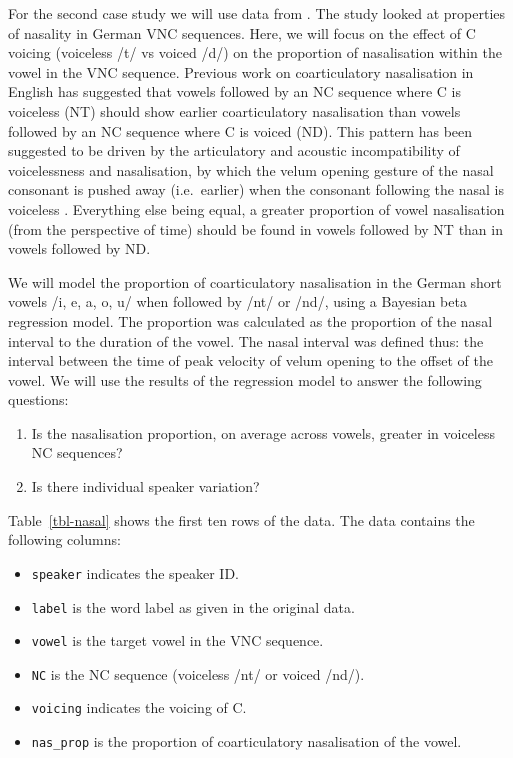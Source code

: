 \documentclass[
  authoryear,
  preprint,
  3p]{elsarticle}
\providecommand{\tightlist}{%
  \setlength{\itemsep}{0pt}\setlength{\parskip}{0pt}}
\begin{document}
For the second case study we will use data from \citet{carignan2021}.
The study looked at properties of nasality in German VNC sequences.
Here, we will focus on the effect of C voicing (voiceless /t/ vs voiced
/d/) on the proportion of nasalisation within the vowel in the VNC
sequence. Previous work on coarticulatory nasalisation in English has
suggested that vowels followed by an NC sequence where C is voiceless
(NT) should show earlier coarticulatory nasalisation than vowels
followed by an NC sequence where C is voiced (ND). This pattern has been
suggested to be driven by the articulatory and acoustic incompatibility
of voicelessness and nasalisation, by which the velum opening gesture of
the nasal consonant is pushed away (i.e.~earlier) when the consonant
following the nasal is voiceless
\citep{fowler2005, beddor2009, cho2017, carignan2015}. Everything else
being equal, a greater proportion of vowel nasalisation (from the
perspective of time) should be found in vowels followed by NT than in
vowels followed by ND.

We will model the proportion of coarticulatory nasalisation in the
German short vowels /i, e, a, o, u/ when followed by /nt/ or /nd/, using
a Bayesian beta regression model. The proportion was calculated as the
proportion of the nasal interval to the duration of the vowel. The nasal
interval was defined thus: the interval between the time of peak
velocity of velum opening to the offset of the vowel. We will use the
results of the regression model to answer the following questions:

\begin{enumerate}
\def\labelenumi{\arabic{enumi}.}
\tightlist
\item
  Is the nasalisation proportion, on average across vowels, greater in
  voiceless NC sequences?
\item
  Is there individual speaker variation?
\end{enumerate}

Table~\ref{tbl-nasal} shows the first ten rows of the data. The data
contains the following columns:

\begin{itemize}
\item
  \texttt{speaker} indicates the speaker ID.
\item
  \texttt{label} is the word label as given in the original data.
\item
  \texttt{vowel} is the target vowel in the VNC sequence.
\item
  \texttt{NC} is the NC sequence (voiceless /nt/ or voiced /nd/).
\item
  \texttt{voicing} indicates the voicing of C.
\item
  \texttt{nas\_prop} is the proportion of coarticulatory nasalisation of
  the vowel.
\end{itemize}
\end{document}
